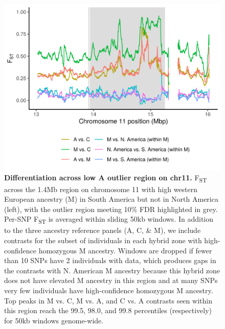 \begin{figure}[ht]
\includegraphics[width = \textwidth]{chapter1/figures/Fst_across_chr11_highM_outlier.png}
 \caption{ \textbf{Differentiation across low A outlier region on chr11.} F\textsubscript{ST} across the 1.4Mb region on chromosome 11 with high western European ancestry (M) in South America but not in North America (left), with the outlier region meeting 10\% FDR highlighted in grey. Per-SNP F\textsubscript{ST} is averaged within sliding 50kb windows. In addition to the three ancestry reference panels (A, C, \& M), we include contrasts for the subset of individuals in each hybrid zone with high-confidence homozygous M ancestry. Windows are dropped if fewer than 10 SNPs have 2 individuals with data, which produces gaps in the contrasts with N. American M ancestry because this hybrid zone does not have elevated M ancestry in this region and at many SNPs very few individuals have high-confidence homozygous M ancestry. Top peaks in M vs. C, M vs. A, and C vs. A contrasts seen within this region reach the 99.5, 98.0, and 99.8 percentiles (respectively) for 50kb windows genome-wide.}
\label{fst_chr11_M_outlier}
\end{figure}

